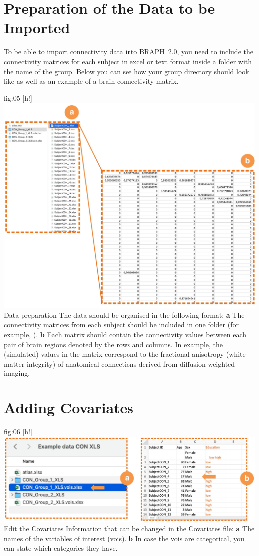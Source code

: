 \documentclass[justified]{tufte-handout}
\begin{document}
\clearpage
\section{Preparation of the Data to be Imported}

To be able to import connectivity data into BRAPH~2.0, you need to include the connectivity matrices for each subject in excel or text format inside a folder with the name of the group. Below you can see how your group directory should look like as well as an example of a brain connectivity matrix.

	{fig:05}
	{
	[h!]
	\includegraphics{fig05.jpg}
	}
	{Data preparation}
	{
	The data should be organised in the following format:
	{\bf a} The connectivity matrices from each subject should be included in one folder (for example, ). 
	{\bf b} Each matrix should contain the connectivity values between each pair of brain regions denoted by the rows and columns. In example, the (simulated) values in the matrix correspond to the fractional anisotropy (white matter integrity) of anatomical connections derived from diffusion weighted imaging.
	} 

\section{Adding Covariates}

	{fig:06}
	{
	[h!]
	\includegraphics{fig06.jpg}
	}
	{Edit the Covariates}
	{
	Information that can be changed in the Covariates file: 
	{\bf a} The names of the variables of interest (vois).
	{\bf b} In case the vois are categorical, you can state which categories they have.
	}
	
\end{document}
